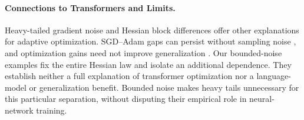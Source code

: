 \paragraph{Connections to Transformers and Limits.}
Heavy-tailed gradient noise \cite{simsekli,zhang_attention} and Hessian
block differences \cite{zhang_hessian} offer other explanations for
adaptive optimization. SGD--Adam gaps can persist without sampling noise
\cite{kunstner2023noise}, and optimization gains need not improve
generalization \cite{wilson2017marginal}. Our bounded-noise examples fix
the entire Hessian law and isolate an additional dependence. They establish
neither a full explanation of transformer optimization nor a language-model
or generalization benefit. Bounded noise makes heavy tails unnecessary for
this particular separation, without disputing their empirical role in
neural-network training.

